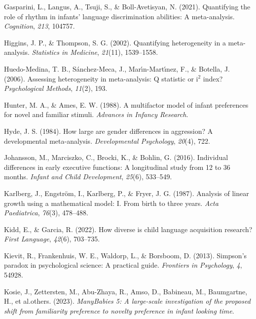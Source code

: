 \documentclass[
  man]{apa6}
\newlength{\cslhangindent}
\newlength{\cslentryspacingunit} %
\newenvironment{CSLReferences}[2] %
 {%
  \setlength{\parindent}{0pt}
  \ifodd #1
  \let\oldpar\par
  \def\par{\hangindent=\cslhangindent\oldpar}
  \fi
  \setlength{\parskip}{#2\cslentryspacingunit}
 }%
 {}
\begin{document}
\begin{CSLReferences}{1}{0}
\leavevmode{}%
Gasparini, L., Langus, A., Tsuji, S., \& Boll-Avetisyan, N. (2021). Quantifying the role of rhythm in infants' language discrimination abilities: A meta-analysis. \emph{Cognition}, \emph{213}, 104757.

\leavevmode{}%
Higgins, J. P., \& Thompson, S. G. (2002). Quantifying heterogeneity in a meta-analysis. \emph{Statistics in Medicine}, \emph{21}(11), 1539--1558.

\leavevmode{}%
Huedo-Medina, T. B., Sánchez-Meca, J., Marı́n-Martı́nez, F., \& Botella, J. (2006). Assessing heterogeneity in meta-analysis: Q statistic or i\(^2\) index? \emph{Psychological Methods}, \emph{11}(2), 193.

\leavevmode{}%
Hunter, M. A., \& Ames, E. W. (1988). A multifactor model of infant preferences for novel and familiar stimuli. \emph{Advances in Infancy Research}.

\leavevmode{}%
Hyde, J. S. (1984). How large are gender differences in aggression? A developmental meta-analysis. \emph{Developmental Psychology}, \emph{20}(4), 722.

\leavevmode{}%
Johansson, M., Marciszko, C., Brocki, K., \& Bohlin, G. (2016). Individual differences in early executive functions: A longitudinal study from 12 to 36 months. \emph{Infant and Child Development}, \emph{25}(6), 533--549.

\leavevmode{}%
Karlberg, J., Engström, I., Karlberg, P., \& Fryer, J. G. (1987). Analysis of linear growth using a mathematical model: I. From birth to three years. \emph{Acta Paediatrica}, \emph{76}(3), 478--488.

\leavevmode{}%
Kidd, E., \& Garcia, R. (2022). How diverse is child language acquisition research? \emph{First Language}, \emph{42}(6), 703--735.

\leavevmode{}%
Kievit, R., Frankenhuis, W. E., Waldorp, L., \& Borsboom, D. (2013). Simpson's paradox in psychological science: A practical guide. \emph{Frontiers in Psychology}, \emph{4}, 54928.

\leavevmode{}%
Kosie, J., Zettersten, M., Abu-Zhaya, R., Amso, D., Babineau, M., Baumgartne, H., et al.others. (2023). \emph{ManyBabies 5: A large-scale investigation of the proposed shift from familiarity preference to novelty preference in infant looking time}.


\end{CSLReferences}
\end{document}
